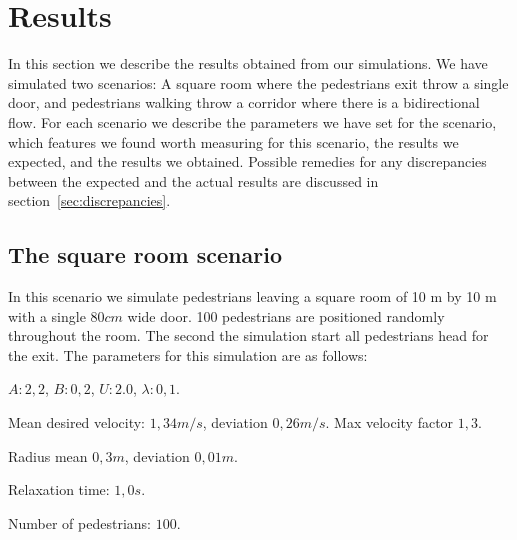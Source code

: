 \section{Results}
\label{sec:results}
In this section we describe the results obtained from our simulations. We have simulated two scenarios: A square room where the pedestrians exit throw a single door, and pedestrians walking throw a corridor where there is a bidirectional flow. For each scenario we describe the parameters we have set for the scenario, which features we found worth measuring for this scenario, the results we expected, and the results we obtained. Possible remedies for any discrepancies between the expected and the actual results are discussed in section~\ref{sec:discrepancies}.

\subsection{The square room scenario}
In this scenario we simulate pedestrians leaving a square room of 10 m by 10 m with a single $80cm$ wide door. 100 pedestrians are positioned randomly throughout the room. The second the simulation start all pedestrians head for the exit. The parameters for this simulation are as follows:
\begin{itemize*}
    \item $A: 2,2$, $B: 0,2$, $U: 2.0$, $\lambda: 0,1$.
    \item Mean desired velocity: $1,34 m/s$, deviation $0,26 m/s$. Max velocity factor $1,3$.
    \item Radius mean $0,3 m$, deviation $0,01 m$.
    \item Relaxation time: $1,0 s$.
    \item Number of pedestrians: $100$.
\end{itemize*}

